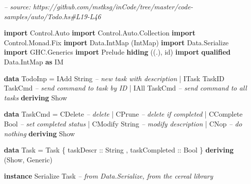 \documentclass[]{article}
\newenvironment{Shaded}{}{}
\newcommand{\CommentTok}[1]{\textcolor[rgb]{0.38,0.63,0.69}{\textit{#1}}}
\newcommand{\DataTypeTok}[1]{\textcolor[rgb]{0.56,0.13,0.00}{#1}}
\newcommand{\FunctionTok}[1]{\textcolor[rgb]{0.02,0.16,0.49}{#1}}
\newcommand{\KeywordTok}[1]{\textcolor[rgb]{0.00,0.44,0.13}{\textbf{#1}}}
\newcommand{\NormalTok}[1]{#1}
\newcommand{\OtherTok}[1]{\textcolor[rgb]{0.00,0.44,0.13}{#1}}
\begin{document}
\begin{Shaded}
\begin{Highlighting}[]
\CommentTok{-- source: https://github.com/mstksg/inCode/tree/master/code-samples/auto/Todo.hs#L19-L46}

\KeywordTok{import} \DataTypeTok{Control.Auto}
\KeywordTok{import} \DataTypeTok{Control.Auto.Collection}
\KeywordTok{import} \DataTypeTok{Control.Monad.Fix}
\KeywordTok{import} \DataTypeTok{Data.IntMap}\NormalTok{             (}\DataTypeTok{IntMap}\NormalTok{)}
\KeywordTok{import} \DataTypeTok{Data.Serialize}
\KeywordTok{import} \DataTypeTok{GHC.Generics}
\KeywordTok{import} \DataTypeTok{Prelude} \KeywordTok{hiding}\NormalTok{          ((.), id)}
\KeywordTok{import} \KeywordTok{qualified} \DataTypeTok{Data.IntMap}   \KeywordTok{as} \DataTypeTok{IM}

\KeywordTok{data} \DataTypeTok{TodoInp} \FunctionTok{=} \DataTypeTok{IAdd}  \DataTypeTok{String}           \CommentTok{-- new task with description}
             \FunctionTok{|} \DataTypeTok{ITask} \DataTypeTok{TaskID} \DataTypeTok{TaskCmd}   \CommentTok{-- send command to task by ID}
             \FunctionTok{|} \DataTypeTok{IAll} \DataTypeTok{TaskCmd}           \CommentTok{-- send command to all tasks}
             \KeywordTok{deriving} \DataTypeTok{Show}

\KeywordTok{data} \DataTypeTok{TaskCmd} \FunctionTok{=} \DataTypeTok{CDelete}          \CommentTok{-- delete}
             \FunctionTok{|} \DataTypeTok{CPrune}           \CommentTok{-- delete if completed}
             \FunctionTok{|} \DataTypeTok{CComplete} \DataTypeTok{Bool}   \CommentTok{-- set completed status}
             \FunctionTok{|} \DataTypeTok{CModify} \DataTypeTok{String}   \CommentTok{-- modify description}
             \FunctionTok{|} \DataTypeTok{CNop}             \CommentTok{-- do nothing}
             \KeywordTok{deriving} \DataTypeTok{Show}

\KeywordTok{data} \DataTypeTok{Task} \FunctionTok{=} \DataTypeTok{Task}\NormalTok{ \{}\OtherTok{ taskDescr     ::} \DataTypeTok{String}
\NormalTok{                 ,}\OtherTok{ taskCompleted ::} \DataTypeTok{Bool}
\NormalTok{                 \} }\KeywordTok{deriving}\NormalTok{ (}\DataTypeTok{Show}\NormalTok{, }\DataTypeTok{Generic}\NormalTok{)}

\KeywordTok{instance} \DataTypeTok{Serialize} \DataTypeTok{Task} \CommentTok{-- from Data.Serialize, from the cereal library}
\end{Highlighting}
\end{Shaded}
\end{document}
